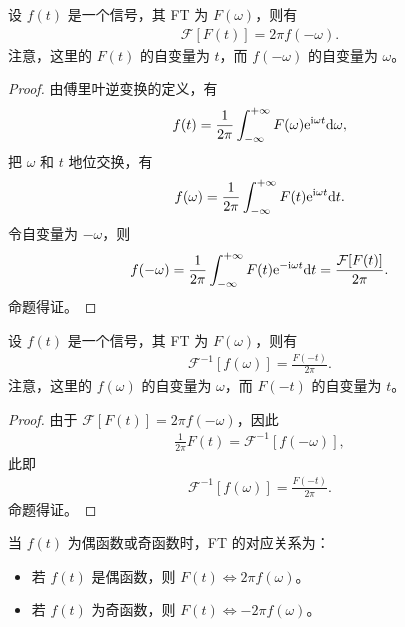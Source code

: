 \begin{property}
    设 $f(t)$ 是一个信号，其 FT 为 $F(\omega)$，则有
    \begin{align*}
        \mathcal{F}[F(t)] = 2\pi f(-\omega).
    \end{align*}
    注意，这里的 $F(t)$ 的自变量为 $t$，而 $f(-\omega)$ 的自变量为 $\omega$。
\end{property}

\begin{proof}
    由傅里叶逆变换的定义，有
    \begin{align*}
        f(t) = \frac{1}{2\pi}\int_{-\infty}^{+\infty} F(\omega)\mathrm{e}^{\mathrm{i}\omega t}\mathrm{d}\omega,
    \end{align*}
    把 $\omega$ 和 $t$ 地位交换，有
    \begin{align*}
        f(\omega) = \frac{1}{2\pi}\int_{-\infty}^{+\infty} F(t)\mathrm{e}^{\mathrm{i}\omega t}\mathrm{d}t.
    \end{align*}
    令自变量为 $-\omega$，则
    \begin{align*}
        f(-\omega) = \frac{1}{2\pi}\int_{-\infty}^{+\infty} F(t)\mathrm{e}^{-\mathrm{i}\omega t}\mathrm{d}t = \frac{\mathcal{F}[F(t)]}{2\pi}.
    \end{align*}
    命题得证。
\end{proof}

\begin{property}
    设 $f(t)$ 是一个信号，其 FT 为 $F(\omega)$，则有
    \begin{align*}
        \mathcal{F}^{-1}[f(\omega)] = \frac{F(-t)}{2\pi}.
    \end{align*}
    注意，这里的 $f(\omega)$ 的自变量为 $\omega$，而 $F(-t)$ 的自变量为 $t$。
\end{property}

\begin{proof}
    由于 $\mathcal{F}[F(t)] = 2\pi f(-\omega)$，因此
    \begin{align*}
        \frac{1}{2\pi}F(t) = \mathcal{F}^{-1}[f(-\omega)],
    \end{align*}
    此即
    \begin{align*}
        \mathcal{F}^{-1}[f(\omega)] = \frac{F(-t)}{2\pi}.
    \end{align*}
    命题得证。
\end{proof}

\begin{corollary}
    当 $f(t)$ 为偶函数或奇函数时，FT 的对应关系为：
    \begin{itemize}
        \item 若 $f(t)$ 是偶函数，则 $F(t) \iff 2\pi f(\omega)$。
        \item 若 $f(t)$ 为奇函数，则 $F(t) \iff -2\pi f(\omega)$。
    \end{itemize}
\end{corollary}

